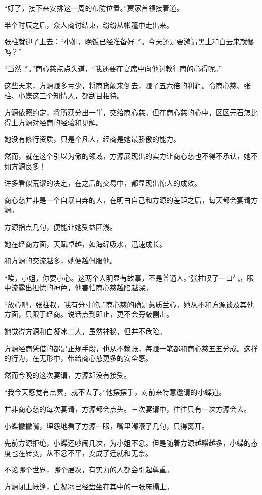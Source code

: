 \begin{this_body}
“好了，接下来安排这一周的布防位置。”贾家首领接着道。

半个时辰之后，众人商讨结束，纷纷从帐篷中走出来。

张柱就迎了上去：“小姐，晚饭已经准备好了。今天还是要邀请黑土和白云来就餐吗？”

“当然了。”商心慈点点头道，“我还要在宴席中向他讨教行商的心得呢。”

这些天来，方源赚多亏少，将商货颠来倒去，赚了五六倍的利润。令商心慈、张柱、小蝶这三个知情人，都刮目相待。

方源依照约定，将所获分出一半，交给商心慈。但在商心慈的心中，区区元石怎比得上方源对经商的经验和见解。

她没有修行资质，只是个凡人，经商是她最骄傲的能力。

然而，就在这个引以为傲的领域，方源展现出的实力让商心慈也不得不承认，她不如方源良多！

许多看似荒谬的决定，在之后的交易中，都显现出惊人的成效。

商心慈并非是一个自暴自弃的人，在明白自己和方源的差距之后，每天都会宴请方源。

方源指点几句，便能让她受益匪浅。

她在经商方面，天赋卓越，如海绵吸水，迅速成长。

和方源的交流越多，她便越佩服他。

“唉，小姐，你要小心。这两个人明显有故事，不是普通人。”张柱叹了一口气，眼中流露出担忧的神色，他害怕商心慈越陷越深。

“放心吧，张柱叔，我有分寸的。”商心慈的确是蕙质兰心，她从不和方源谈及其他方面，只限于经商。说话点到即止，更不会旁敲侧击。

她觉得方源和白凝冰二人，虽然神秘，但并不危险。

方源经商凭借的都是正规手段，也从不赖账，每赚一笔都和商心慈五五分成。这样的行为，在无形中，带给商心慈更多的安全感。

然而今晚的这次宴请，方源却没有接受。

“我今天感觉有点累，就不去了。”他摆摆手，对前来特意邀请的小蝶道。

并非商心慈的每次宴请，方源都会点头。三次宴请中，往往只有一次方源会去。

小蝶撇撇嘴，埋怨地看了方源一眼，嘴里嘟囔了几句，只得离开。

先前方源拒绝，小蝶还吵闹几次，为小姐不忿。但是随着方源越赚越多，小蝶的态度也在转变，从不忿不平，变成了迁就和无奈。

不论哪个世界，哪个层次，有实力的人都会引起尊重。

方源闭上帐篷，白凝冰已经盘坐在其中的一张床榻上。


\end{this_body}
